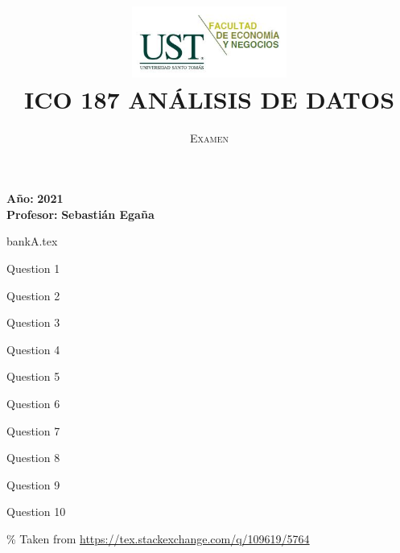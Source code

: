 \documentclass[
  10pt,
  answers]{article}
\title{\textsc{\Large{\includegraphics[width=2in,height=\textheight]{logo_fen.jpg}\\
ICO 187 ANÁLISIS DE DATOS}}\vspace{-2ex}}
\author{\textsc{\Large{Examen}}}
\date{}
\begin{document}
\maketitle
\vspace{-0.75cm}
\begin{center}
\normalsize{\textbf{Año:} \textbf{2021}} \\
\normalsize{\textbf{Profesor:} \textbf{Sebastián Egaña}} \\
\vspace{0.25cm}
\end{center}


\begin{filecontents*}{bankA.tex}
\begin{questionblock}
Question 1
\end{questionblock}
\begin{questionblock}
Question 2
\end{questionblock}
\begin{questionblock}
Question 3
\end{questionblock}
\begin{questionblock}
Question 4
\end{questionblock}
\begin{questionblock}
Question 5
\end{questionblock}
\begin{questionblock}
Question 6
\end{questionblock}
\begin{questionblock}
Question 7
\end{questionblock}
\begin{questionblock}
Question 8
\end{questionblock}
\begin{questionblock}
Question 9
\end{questionblock}
\begin{questionblock}
Question 10
\end{questionblock}
\end{filecontents*}

\makeatletter\% Taken from \url{https://tex.stackexchange.com/q/109619/5764}
\def\declarenumlist#1#2#3{%
  \edef\csname pgfmath@randomlist@#1\endcsname{#3}%
  \count@\@ne
  \loop
    \edef
    \csname pgfmath@randomlist@#1@\the\count@\endcsname
      {\the\count@}
    \ifnum\count@<#3\relax
    \advance\count@\@ne
  \repeat}
\def\prunelist#1{%
  \xdef\csname pgfmath@randomlist@#1\endcsname
          {\the\numexpr\csname pgfmath@randomlist@#1\endcsname-1\relax}
  \count@\pgfmath@randomtemp 
  \loop
    \global\let
    \csname pgfmath@randomlist@#1@\the\count@\endcsname
    \csname pgfmath@randomlist@#1@\the\numexpr\count@+1\relax\endcsname
    \ifnum\count@<\csname pgfmath@randomlist@#1\endcsname\relax
      \advance\count@\@ne
  \repeat}
\makeatother
\end{document}
